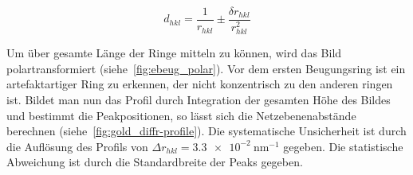 \documentclass[slug=TEM, room=IFW, supervisor=?, coursedate=23.\ 01.\ 2020]{../../Lab_Report_LaTeX/lab_report}
\begin{document}
\begin{equation}
  \label{eq:beugrad}
  d_{hkl} = \frac{1}{r_{hkl}} \pm \frac{\delta r_{hkl}}{r_{hkl}^2}
\end{equation}

Um \"uber gesamte L\"ange der Ringe mitteln zu k\"onnen, wird das Bild
polartransformiert (siehe~\ref{fig:ebeug_polar}). Vor dem ersten
Beugungsring ist ein artefaktartiger Ring zu erkennen, der nicht
konzentrisch zu den anderen ringen ist. Bildet man nun das Profil
durch Integration der gesamten H\"ohe des Bildes und bestimmt die
Peakpositionen, so l\"asst sich die Netzebenenabst\"ande berechnen
(siehe~\ref{fig:gold_diffr-profile}). Die systematische Unsicherheit
ist durch die Aufl\"osung des Profils von
\(\Delta r_{hkl}=\SI{3.3e-2}{\nano\meter^{-1}}\) gegeben. Die
statistische Abweichung ist durch die Standardbreite der Peaks gegeben.
\end{document}

